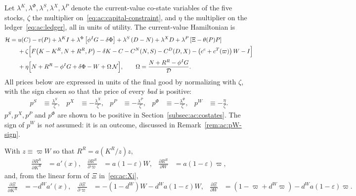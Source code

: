  Let $\lambda^K,\lambda^\Phi,\lambda^S,\lambda^X,\lambda^P$ denote the current-value co-state variables of the five stocks, $\zeta$ the multiplier on~\eqref{eq:ac:capital-constraint}, and $\eta$ the multiplier on the ledger~\eqref{eq:ac:ledger}, all in units of utility. The current-value Hamiltonian is
\begin{align}
\mathcal H =\;& u(C)-v(P)+\lambda^KI+\lambda^\Phi\left[\phi^IG-\delta\Phi\right]+\lambda^S\left(D-N\right)+\lambda^XD+\lambda^P\left[\Xi-\theta(P)P\right]
\notag \\
&+\zeta\Big[F\!\left(K-K^R,N+R^R,P\right)-\delta K-C-C^N(N,S)-C^D(D,X)-\left(c^c+c^T(\varpi)\right)W-I\Big]
\notag \\
&+\eta\Big[N+R^R-\phi^IG+\delta\Phi-W+\Omega\,\mathcal N\Big],
\qquad
\Omega=\frac{N+R^R-\phi^IG}{\mathcal D}.
\label{eq:ac:hamiltonian}
\end{align}
All prices below are expressed in units of the final good by normalizing with $\zeta$, with the sign chosen so that the price of every \emph{bad} is positive:
\begin{align}
p^S &\equiv \frac{\lambda^S}{\zeta},
&
p^X &\equiv -\frac{\lambda^X}{\zeta},
&
p^P &\equiv -\frac{\lambda^P}{\zeta},
&
p^\Phi &\equiv -\frac{\lambda^\Phi}{\zeta},
&
p^W &\equiv -\frac{\eta}{\zeta}.
\label{eq:ac:normalizations}
\end{align}
$p^S,p^X,p^P$ and $p^\Phi$ are shown to be positive in Section~\ref{subsec:ac:costates}. The sign of $p^W$ is \emph{not} assumed: it is an outcome, discussed in Remark~\ref{rem:ac:pW-sign}.

 With $z\equiv\varpi W$ so that $R^R=a(K^R/z)z$,
\begin{align}
\frac{\partial R^R}{\partial K^R}&=a'(x),
&
\frac{\partial R^R}{\partial\varpi}&=a\left(1-\varepsilon\right)W,
&
\frac{\partial R^R}{\partial W}&=a\left(1-\varepsilon\right)\varpi,
\label{eq:ac:RR-derivatives}
\end{align}
and, from the linear form of $\Xi$ in~\eqref{eq:ac:Xi},
\begin{align}
\frac{\partial\Xi}{\partial K^R}&=-d^Wa'(x),
&
\frac{\partial\Xi}{\partial\varpi}&=-\left(1-d^W\right)W-d^Wa\left(1-\varepsilon\right)W,
&
\frac{\partial\Xi}{\partial W}&=\left(1-\varpi+d^W\varpi\right)-d^Wa\left(1-\varepsilon\right)\varpi.
\label{eq:ac:Xi-derivatives}
\end{align}

